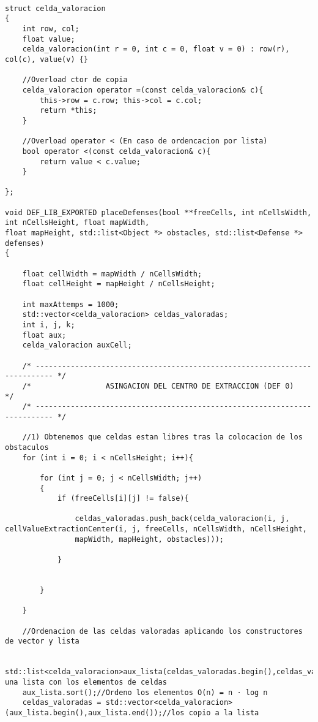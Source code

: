 \begin{lstlisting}

struct celda_valoracion
{
    int row, col;
    float value;
    celda_valoracion(int r = 0, int c = 0, float v = 0) : row(r), col(c), value(v) {}
    
    //Overload ctor de copia
    celda_valoracion operator =(const celda_valoracion& c){
        this->row = c.row; this->col = c.col;
        return *this;
    }

    //Overload operator < (En caso de ordencacion por lista)
    bool operator <(const celda_valoracion& c){
        return value < c.value;
    }

};

void DEF_LIB_EXPORTED placeDefenses(bool **freeCells, int nCellsWidth, int nCellsHeight, float mapWidth, 
float mapHeight, std::list<Object *> obstacles, std::list<Defense *> defenses)
{

    float cellWidth = mapWidth / nCellsWidth;
    float cellHeight = mapHeight / nCellsHeight;

    int maxAttemps = 1000;
    std::vector<celda_valoracion> celdas_valoradas;
    int i, j, k;
    float aux;
    celda_valoracion auxCell;

    /* -------------------------------------------------------------------------- */
    /*                 ASINGACION DEL CENTRO DE EXTRACCION (DEF 0)                */
    /* -------------------------------------------------------------------------- */

    //1) Obtenemos que celdas estan libres tras la colocacion de los obstaculos
    for (int i = 0; i < nCellsHeight; i++){
        
        for (int j = 0; j < nCellsWidth; j++)
        {
            if (freeCells[i][j] != false){
                
                celdas_valoradas.push_back(celda_valoracion(i, j, cellValueExtractionCenter(i, j, freeCells, nCellsWidth, nCellsHeight, 
                mapWidth, mapHeight, obstacles)));

            }
                
                
        }

    }
    
    //Ordenacion de las celdas valoradas aplicando los constructores de vector y lista 
    
    std::list<celda_valoracion>aux_lista(celdas_valoradas.begin(),celdas_valoradas.end());//Creo una lista con los elementos de celdas
    aux_lista.sort();//Ordeno los elementos O(n) = n · log n
    celdas_valoradas = std::vector<celda_valoracion>(aux_lista.begin(),aux_lista.end());//los copio a la lista



\end{lstlisting}
